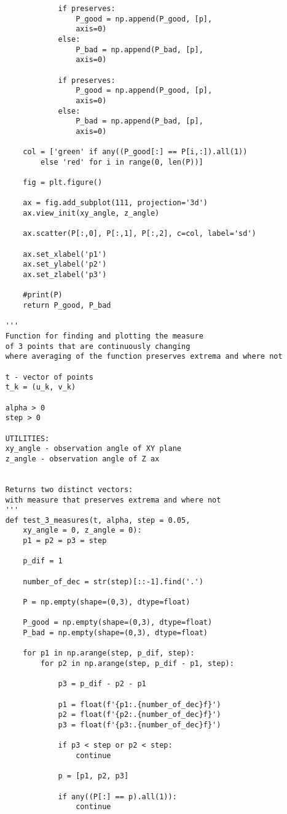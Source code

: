 \documentclass[12pt]{article}
\begin{document}
\begin{verbatim}
				if preserves:
					P_good = np.append(P_good, [p], 
					axis=0)
				else:
					P_bad = np.append(P_bad, [p], 
					axis=0)
				
				if preserves:
					P_good = np.append(P_good, [p], 
					axis=0)
				else:
					P_bad = np.append(P_bad, [p], 
					axis=0)
		
		col = ['green' if any((P_good[:] == P[i,:]).all(1)) 
			else 'red' for i in range(0, len(P))]
		
		fig = plt.figure()
		
		ax = fig.add_subplot(111, projection='3d')
		ax.view_init(xy_angle, z_angle)
		
		ax.scatter(P[:,0], P[:,1], P[:,2], c=col, label='sd')
		
		ax.set_xlabel('p1')
		ax.set_ylabel('p2')
		ax.set_zlabel('p3')
		
		#print(P)
		return P_good, P_bad
	
	'''
	Function for finding and plotting the measure
	of 3 points that are continuously changing
	where averaging of the function preserves extrema and where not
	
	t - vector of points
	t_k = (u_k, v_k)
	
	alpha > 0
	step > 0
	
	UTILITIES:
	xy_angle - observation angle of XY plane
	z_angle - observation angle of Z ax
	
	
	Returns two distinct vectors:
	with measure that preserves extrema and where not
	'''
	def test_3_measures(t, alpha, step = 0.05, 
		xy_angle = 0, z_angle = 0):
		p1 = p2 = p3 = step
		
		p_dif = 1
		
		number_of_dec = str(step)[::-1].find('.')
		
		P = np.empty(shape=(0,3), dtype=float)
		
		P_good = np.empty(shape=(0,3), dtype=float)
		P_bad = np.empty(shape=(0,3), dtype=float)
		
		for p1 in np.arange(step, p_dif, step): 
			for p2 in np.arange(step, p_dif - p1, step):
			
				p3 = p_dif - p2 - p1
				
				p1 = float(f'{p1:.{number_of_dec}f}')
				p2 = float(f'{p2:.{number_of_dec}f}')
				p3 = float(f'{p3:.{number_of_dec}f}')
				
				if p3 < step or p2 < step:
					continue
				
				p = [p1, p2, p3]
				
				if any((P[:] == p).all(1)):
					continue
				

\end{verbatim}
\end{document}
